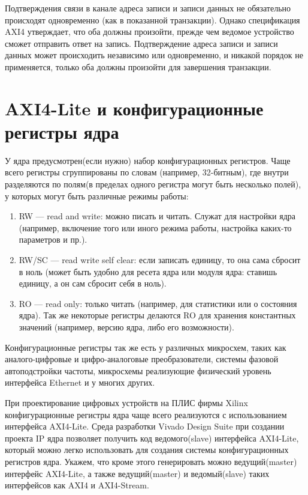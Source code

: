 Подтверждения связи в канале адреса записи и записи данных не обязательно происходят одновременно (как в показанной транзакции). Однако спецификация AXI4 утверждает, что оба должны произойти, прежде чем ведомое устройство сможет отправить ответ на запись. Подтверждение адреса записи и записи данных может происходить независимо или одновременно, и никакой порядок не применяется, только оба должны произойти для завершения транзакции.

\section{AXI4-Lite и конфигурационные регистры ядра}

У ядра предусмотрен(если нужно) набор конфигурационных регистров. Чаще всего регистры сгруппированы по словам (например, 32-битным), где внутри разделяются по полям(в пределах одного регистра могут быть несколько полей), у которых могут быть различные режимы работы:
\begin{enumerate}
	\item RW — read and write: можно писать и читать. Служат для настройки ядра (например, включение того или иного режима работы, настройка каких-то параметров и пр.).
	\item RW/SC — read write self clear: если записать единицу, то она сама сбросит в ноль (может быть удобно для ресета ядра или модуля ядра: ставишь единицу, а он сам сбросит себя в ноль).
	\item RO — read only: только читать (например, для статистики или о состояния ядра). Так же некоторые регистры делаются RO для хранения константных значений (например, версию ядра, либо его возможности).
\end{enumerate}

Конфигурационные регистры так же есть у различных микросхем, таких как аналого-цифровые и цифро-аналоговые преобразователи, системы фазовой автоподстройки частоты, микросхемы реализующие физический уровень интерфейса Ethernet и у многих других.

При проектирование цифровых устройств на ПЛИС фирмы Xilinx конфигурационные регистры ядра чаще всего реализуются с использованием интерфейса AXI4-Lite. Среда разработки Vivado Design Suite при создании проекта IP ядра позволяет получить код ведомого(slave) интерфейса AXI4-Lite, который можно легко использовать для создания системы конфигурационных регистров ядра. Укажем, что кроме этого генерировать можно ведущий(master) интерфейс AXI4-Lite, а также ведущий(master) и ведомый(slave) таких интерфейсов как AXI4 и AXI4-Stream.

